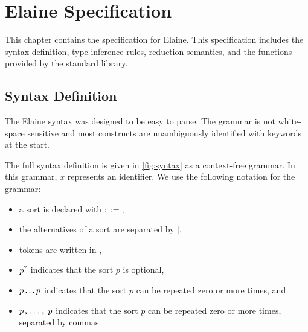 \chapter{Elaine Specification}\label{chap:spec}

This chapter contains the specification for Elaine. This specification includes the syntax definition, type inference rules, reduction semantics, and the functions provided by the standard library.

\section{Syntax Definition}\label{sec:syntax}

The Elaine syntax was designed to be easy to parse. The grammar is not white-space sensitive and most constructs are unambiguously identified with keywords at the start.

The full syntax definition is given in \cref{fig:syntax} as a context-free grammar. In this grammar, $x$ represents an identifier. We use the following notation for the grammar:
\begin{itemize}
    \item a sort is declared with $::=$,
    \item the alternatives of a sort are separated by $|$,
    \item tokens are written in ,
    \item $p^?$ indicates that the sort $p$ is optional,
    \item $p \dots p$ indicates that the sort $p$ can be repeated zero or more times, and
    \item $p\text{\texttt{,}} \dots \text{\texttt{,}}\ p$ indicates that the sort $p$ can be repeated zero or more times, separated by commas.
\end{itemize}

